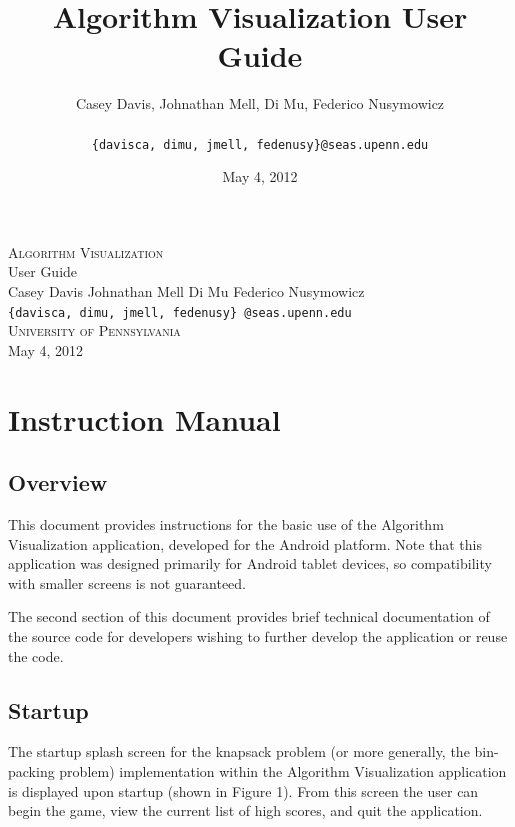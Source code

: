 \documentclass[11pt]{article}
\title{Algorithm Visualization User Guide\\}
\author{Casey Davis, Johnathan Mell, Di Mu, Federico Nusymowicz \\\\
\texttt{\{davisca, dimu, jmell, fedenusy\}@seas.upenn.edu}}
\date{May 4, 2012}
\begin{document}
\begin{titlepage}
\begin{center}
\vspace*{\fill}

\textsc{\Huge Algorithm Visualization}\\[0.75cm]

\huge User Guide\\[1.25cm]

\large Casey Davis \;\;\;\; Johnathan Mell \;\;\;\;   Di Mu \;\;\;\;   Federico
Nusymowicz \\[0.5cm]

\large \texttt{\{davisca, dimu, jmell, fedenusy\} @seas.upenn.edu} \\[1.75cm]

\large \textsc{University of Pennsylvania} \\[0.5cm]

\large May 4, 2012

\vspace*{\fill}
\end{center}
\end{titlepage}

\tableofcontents

\newpage

\section{Instruction Manual}

\subsection{Overview}

This document provides instructions for the basic use of the Algorithm
Visualization application, developed for the Android platform.  Note that
this application was designed primarily for Android tablet devices, so
compatibility with smaller screens is not guaranteed.

The second section of this document provides brief technical documentation of
the source code for developers wishing to further develop the application
or reuse the code.

\subsection{Startup}

The startup splash screen for the knapsack problem (or more generally, the
bin-packing problem) implementation within the Algorithm Visualization
application is displayed upon startup (shown in Figure 1).  From this screen
the user can begin the game, view the current list of high scores, and quit
the application.\\
\end{document}
